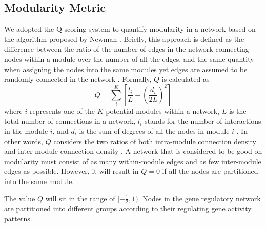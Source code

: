 \subsection{Modularity Metric}
We adopted the Q scoring system to quantify modularity in a network based on the algorithm proposed by Newman \cite{newman2004finding}. Briefly, this approach is defined as the difference between the ratio of the number of edges in the network connecting nodes within a module over the number of all the edges, and the same quantity when assigning the nodes into the same modules yet edges are assumed to be randomly connected in the network \cite{kashtan2005spontaneous}. Formally, $Q$ is calculated as 
\begin{equation}
Q = \sum_{i}^{K}[\frac{l_i}{L} - (\frac{d_i}{2L})^2]
\end{equation}
where $i$ represents one of the $K$ potential modules within a network, $L$ is the total number of connections in a network, $l_i$ stands for the number of interactions in the module $i$, and $d_i$ is the sum of degrees of all the nodes in module $i$ \cite{espinosa2010specialization}. In other words, $Q$ considers the two ratios of both intra-module connection density and inter-module connection density \cite{newman2004finding}. A network that is considered to be good on modularity must consist of as many within-module edges and as few inter-module edges as possible. However, it will result in $Q=0$ if all the nodes are partitioned into the same module. 

The value $Q$ will sit in the range of $\left.[-\frac{1}{2}, 1\right.)$. Nodes in the gene regulatory network are partitioned into different groups according to their regulating gene activity patterns. 


